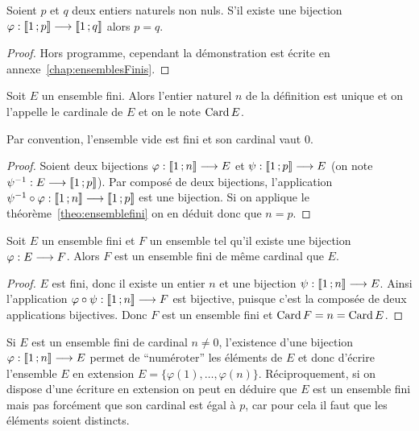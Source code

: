\begin{theo}
  \label{theo:ensemblefini}
  Soient \(p\) et \(q\) deux entiers naturels non nuls. S'il existe une
  bijection
  \(\varphi:\mathopen{\llbracket}1\mathclose{}\mathpunct{};p\mathclose{\rrbracket} \longrightarrow{} \mathopen{\llbracket}1\mathclose{}\mathpunct{};q\mathclose{\rrbracket}\)
  alors \(p = q\).
\end{theo}

\begin{proof}
  Hors programme, cependant la démonstration est écrite en
  annexe~\ref{chap:ensemblesFinis}.
\end{proof}

\begin{prop}[Définition]
  Soit \(E\) un ensemble fini. Alors l'entier naturel \(n\) de la définition
  est unique et on l'appelle le cardinale de \(E\) et on le note \(\operatorname{Card}
  E\).
\end{prop}

Par convention, l'ensemble vide est fini et son cardinal vaut \(0\).

\begin{proof}
  Soient deux bijections \(\varphi:\mathopen{\llbracket}1\mathclose{}\mathpunct{};n\mathclose{\rrbracket} \longrightarrow{} E\)
  et \(\psi:\mathopen{\llbracket}1\mathclose{}\mathpunct{};p\mathclose{\rrbracket} \longrightarrow{} E\) (on note
  \(\psi^{-1}:E \longrightarrow{} \mathopen{\llbracket}1\mathclose{}\mathpunct{};p\mathclose{\rrbracket}\)). Par composé de
  deux bijections, l'application \(\psi^{-1}\circ
  \varphi:\mathopen{\llbracket}1\mathclose{}\mathpunct{};n\mathclose{\rrbracket} \longrightarrow{} \mathopen{\llbracket}1\mathclose{}\mathpunct{};p\mathclose{\rrbracket}\) est une
  bijection. Si on applique le théorème~\ref{theo:ensemblefini} on en déduit
  donc que \(n = p\).
\end{proof}

\begin{prop}
  Soit \(E\) un ensemble fini et \(F\) un ensemble tel qu'il existe une
  bijection \(\varphi:E \longrightarrow{} F\). Alors \(F\) est un ensemble fini
  de même cardinal que \(E\).
\end{prop}

\begin{proof}
  \(E\) est fini, donc il existe un entier \(n\) et une bijection
  \(\psi:\mathopen{\llbracket}1\mathclose{}\mathpunct{};n\mathclose{\rrbracket} \longrightarrow{} E\). Ainsi l'application
  \(\varphi\circ\psi:\mathopen{\llbracket}1\mathclose{}\mathpunct{};n\mathclose{\rrbracket} \longrightarrow{} F\) est
  bijective, puisque c'est la composée de deux applications bijectives. Donc
  \(F\) est un ensemble fini et \(\operatorname{Card} F = n = \operatorname{Card} E\).
\end{proof}

Si \(E\) est un ensemble fini de cardinal \(n\neq 0\), l'existence d'une
bijection \(\varphi:\mathopen{\llbracket}1\mathclose{}\mathpunct{};n\mathclose{\rrbracket} \longrightarrow{} E\) permet de
``numéroter'' les éléments de \(E\) et donc d'écrire l'ensemble \(E\) en
extension \(E = \{\varphi(1), \ldots, \varphi(n)\}\).
Réciproquement, si on dispose d'une écriture en extension on peut en déduire
que \(E\) est un ensemble fini mais pas forcément que son cardinal est égal
à \(p\), car pour cela il faut que les éléments soient distincts.

